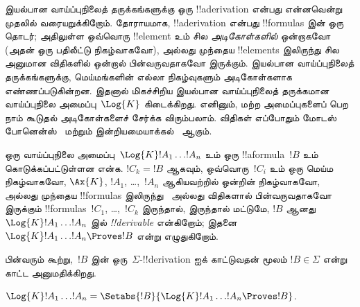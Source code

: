 \documentclass[../../../include/open-logic-section]{subfiles}
\begin{document}


இயல்பான வாய்ப்புநிலைத் தருக்கங்களுக்கு ஒரு !!a{derivation} என்பது என்னவென்று
முதலில் வரையறுக்கிறோம். தோராயமாக, !!a{derivation} என்பது !!{formula}s இன்
ஒரு தொடர்; அதிலுள்ள ஒவ்வொரு !!{element} உம் சில \emph{அடிகோள்களில்}
ஒன்றாகவோ (அதன் ஒரு பதிலீட்டு நிகழ்வாகவோ), அல்லது முந்தைய !!{element}s
இலிருந்து சில அனுமான விதிகளில் ஒன்றால் பின்வருவதாகவோ இருக்கும். இயல்பான
வாய்ப்புநிலைத் தருக்கங்களுக்கு, மெய்மங்களின் எல்லா நிகழ்வுகளும்
அடிகோள்களாக எண்ணப்படுகின்றன. இதனால் மிகச்சிறிய இயல்பான வாய்ப்புநிலைத்
தருக்கமான வாய்ப்புநிலை அமைப்பு~$\Log{K}$ கிடைக்கிறது. எனினும், மற்ற
அமைப்புகளைப் பெற நாம் கூடுதல் அடிகோள்களைச் சேர்க்க விரும்பலாம். விதிகள்
எப்போதும் மோடஸ் போனென்ஸ்~\MP{} மற்றும் இன்றியமையாக்கல்~\Nec{} ஆகும்.

\begin{defn}
  ஒரு வாய்ப்புநிலை அமைப்பு~$\Log{K} !A_1 \dots !A_n$ உம் ஒரு
  !!a{formula}~$!B$ உம் கொடுக்கப்பட்டுள்ளன என்க. $!C_k = !B$ ஆகவும்,
  ஒவ்வொரு~$!C_i$ உம் ஒரு மெய்ம நிகழ்வாகவோ, $\Ax{K}$,
   $!A_1$, \dots,~$!A_n$ ஆகியவற்றில்
  ஒன்றின் நிகழ்வாகவோ, அல்லது முந்தைய !!{formula}s இலிருந்து~\MP{} அல்லது
  \Nec{} விதிகளால் பின்வருவதாகவோ இருக்கும் !!{formula}s~$!C_1$,
  \dots,~$!C_k$ இருந்தால், இருந்தால் மட்டுமே, $!B$ ஆனது
  $\Log{K} !A_1 \dots !A_n$ இல் \emph{!!{derivable}} என்கிறோம்; இதனை
  $\Log{K} !A_1 \dots !A_n \Proves !B$ என்று எழுதுகிறோம்.
\end{defn}

பின்வரும் கூற்று,~$!B$ இன் ஒரு~$\Sigma$-!!{derivation} ஐக் காட்டுவதன்
மூலம் $!B \in \Sigma$ என்று காட்ட அனுமதிக்கிறது.

\begin{prop}
  $\Log{K} !A_1 \dots !A_n = \Setabs{!B}{\Log{K} !A_1 \dots !A_n \Proves !B}$.
\end{prop}
\end{document}
